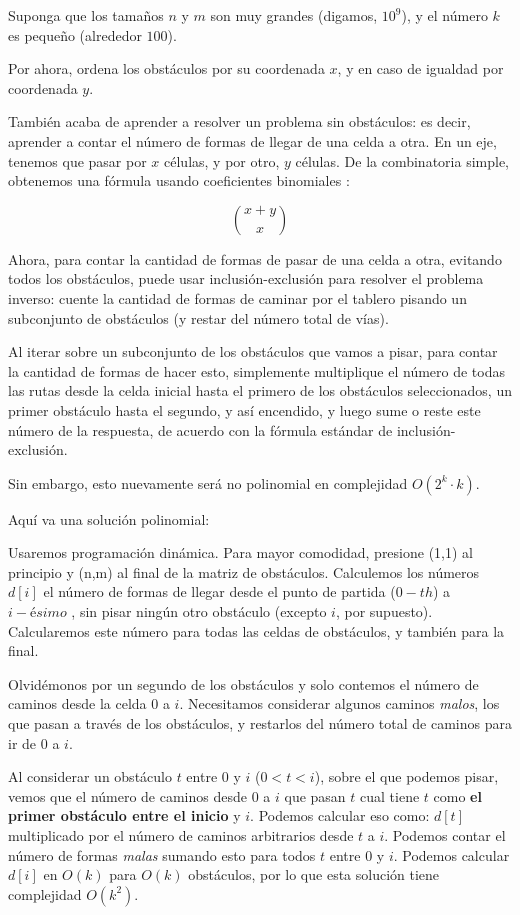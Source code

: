 Suponga que los tamaños $n$ y $m$ son muy grandes (digamos, $10^9$), y el número $k$ es pequeño (alrededor $100$).

Por ahora, ordena los obstáculos por su coordenada $x$, y en caso de igualdad por coordenada $y$.

También acaba de aprender a resolver un problema sin obstáculos: es decir, aprender a contar el número de formas de llegar de una celda a otra. En un eje, tenemos que pasar por $x$ células, y por otro, $y$ células. De la combinatoria simple, obtenemos una fórmula usando coeficientes binomiales :

$$\binom{x+y}{x}$$

Ahora, para contar la cantidad de formas de pasar de una celda a otra, evitando todos los obstáculos, puede usar inclusión-exclusión para resolver el problema inverso: cuente la cantidad de formas de caminar por el tablero pisando un subconjunto de obstáculos (y restar del número total de vías).

Al iterar sobre un subconjunto de los obstáculos que vamos a pisar, para contar la cantidad de formas de hacer esto, simplemente multiplique el número de todas las rutas desde la celda inicial hasta el primero de los obstáculos seleccionados, un primer obstáculo hasta el segundo, y así encendido, y luego sume o reste este número de la respuesta, de acuerdo con la fórmula estándar de inclusión-exclusión.

Sin embargo, esto nuevamente será no polinomial en complejidad $O(2^k \cdot k)$.

Aquí va una solución polinomial:

Usaremos programación dinámica. Para mayor comodidad, presione (1,1) al principio y (n,m) al final de la matriz de obstáculos. Calculemos los números $d[i]$ el número de formas de llegar desde el punto de partida ($0-th$) a $i-ésimo$ , sin pisar ningún otro obstáculo (excepto $i$, por supuesto). Calcularemos este número para todas las celdas de obstáculos, y también para la final.


Olvidémonos por un segundo de los obstáculos y solo contemos el número de caminos desde la celda $0$ a $i$. Necesitamos considerar algunos caminos \emph{malos}, los que pasan a través de los obstáculos, y restarlos del número total de caminos para ir de $0$ a $i$.

Al considerar un obstáculo $t$ entre $0$ y $i$ ($0 < t < i$), sobre el que podemos pisar, vemos que el número de caminos desde $0$ a $i$ que pasan $t$ cual tiene $t$ como \textbf{el primer obstáculo entre el inicio} y $i$. Podemos calcular eso como: $d[t]$ multiplicado por el número de caminos arbitrarios desde $t$ a $i$. Podemos contar el número de formas \emph{malas} sumando esto para todos $t$ entre $0$ y $i$. Podemos calcular $d[i]$ en $O(k)$ para $O(k)$ obstáculos, por lo que esta solución tiene complejidad $O(k^2)$.


